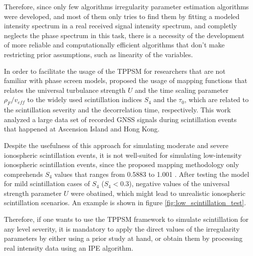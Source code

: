 Therefore, since only few algorithms irregularity parameter estimation algorithms were developed, and most of them only tries to find them by fitting a modeled intensity spectrum in a real received signal intensity spectrum, and completly neglects the phase spectrum in this task, there is a necessity of the development of more reliable and computationally efficient algorithms that don't make restricting prior assumptions, such as linearity of the variables.

In order to facilitate the usage of the TPPSM for researchers that are not familiar with phase screen models, \cite{xuTwoparameterMultifrequencyGPS2020} proposed the usage of mapping functions that relates the universal turbulance strength $U$ and the time scaling parameter $\rho_F / v_{eff}$ to the widely used scintillation indices $S_4$ and the $\tau_0$, which are related to the scintillation severity and the decorrelation time, respectively. This work analyzed a large data set of recorded GNSS signals during scintillation events that happened at Ascension Island and Hong Kong.

Despite the usefulness of this approach for simulating moderate and severe ionospheric scintillation events, it is not well-suited for simulating low-intensity ionospheric scintillation events, since the proposed mapping methodology only comprehends $S_4$ values that ranges from 0.5883 to 1.001 \cite[\textit{Libraries/Utilities/ParaMapping.m}]{githubGitHubCusenselabgnssscintillationsimulator_2param}. After testing the model for mild scintillation cases of $S_4$ ($S_4 < 0.3$), negative values of the universal strength parameter $U$ were obatined, which might lead to unrealistic ionospheric scintillation scenarios. An example is shown in figure \ref{fig:low_scintillation_test}.

Therefore, if one wants to use the TPPSM framework to simulate scintillation for any level severity, it is mandatory to apply the direct values of the irregularity parameters by either using a prior study at hand, or obtain them by processing real intensity data using an IPE algorithm.

